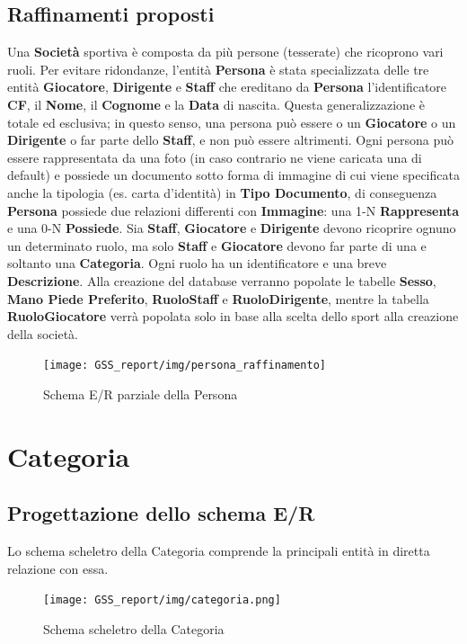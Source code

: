 \documentclass[a4paper,12pt]{report}
\begin{document}
\subsection{Raffinamenti proposti}
Una \textbf{Società} sportiva è composta da più persone (tesserate) che ricoprono vari ruoli.
Per evitare ridondanze, l'entità \textbf{Persona} è stata specializzata delle tre entità \textbf{Giocatore}, \textbf{Dirigente} e \textbf{Staff} che ereditano da \textbf{Persona} l'identificatore  \textbf{CF}, il \textbf{Nome}, il \textbf{Cognome} e la \textbf{Data} di nascita.
Questa generalizzazione è totale ed esclusiva; in questo senso, una persona può essere o un \textbf{Giocatore} o un \textbf{Dirigente} o far parte dello \textbf{Staff}, e non può essere altrimenti. \newline \newline
Ogni persona può essere rappresentata da una foto (in caso contrario ne viene caricata una di default) e possiede un documento sotto forma di immagine di cui viene specificata anche la tipologia (es. carta d'identità) in \textbf{Tipo Documento}, di conseguenza \textbf{Persona} possiede due relazioni differenti con \textbf{Immagine}: una 1-N \textbf{Rappresenta} e una 0-N \textbf{Possiede}. \newline \newline
Sia \textbf{Staff}, \textbf{Giocatore} e \textbf{Dirigente} devono ricoprire ognuno un determinato ruolo, ma solo \textbf{Staff} e \textbf{Giocatore} devono far parte di una e soltanto una \textbf{Categoria}. Ogni ruolo ha un identificatore e una breve \textbf{Descrizione}.
Alla creazione del database verranno popolate le tabelle \textbf{Sesso}, \textbf{Mano Piede Preferito}, \textbf{RuoloStaff} e \textbf{RuoloDirigente}, mentre la tabella \textbf{RuoloGiocatore} verrà popolata solo in base alla scelta dello sport alla creazione della società.
\begin{figure}[htp]
    \centering
    \texttt{[image: GSS\_report/img/persona\_raffinamento]}
    \caption{Schema E/R parziale della Persona}
\end{figure}

\newpage
\section{Categoria}
\subsection{Progettazione dello schema E/R}
Lo schema scheletro della Categoria comprende la principali entità in diretta relazione con essa.
\begin{figure}[htp]
    \centering
    \texttt{[image: GSS\_report/img/categoria.png]}
    \caption{Schema scheletro della Categoria}
\end{figure}
\end{document}
